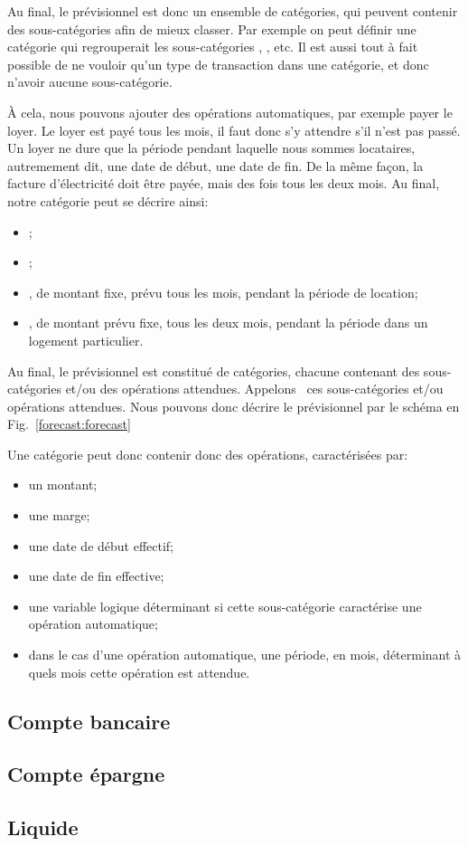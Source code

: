 Au final, le prévisionnel est donc un ensemble de catégories, qui
peuvent contenir des sous-catégories afin de mieux classer. Par
exemple on peut définir une catégorie 
qui regrouperait les sous-catégories ,
, etc. Il est aussi tout à fait possible
de ne vouloir qu'un type de transaction dans une catégorie, et
donc n'avoir aucune sous-catégorie.

\`A cela, nous pouvons ajouter des opérations automatiques, par
exemple payer le loyer. Le loyer est payé tous les mois, il faut
donc s'y attendre s'il n'est pas passé. Un loyer ne dure que la période
pendant laquelle nous sommes locataires, autremement dit, une date de
début, une date de fin. De la même façon, la facture d'électricité doit
être payée, mais des fois tous les deux mois. Au final, notre catégorie
 peut se décrire ainsi:
\begin{itemize}
\item {};
\item {};
\item {}, de montant fixe, prévu tous les mois, pendant la période
                           de location;
\item {}, de montant prévu fixe, tous les deux mois,
                                    pendant la période dans un logement particulier.
\end{itemize}

Au final, le prévisionnel est constitué de catégories, chacune contenant des sous-catégories
et/ou des opérations attendues. Appelons \operation\ ces sous-catégories et/ou
opérations attendues. Nous pouvons donc décrire le prévisionnel par le schéma
en Fig.~\ref{forecast:forecast}

Une catégorie peut donc contenir donc des opérations, caractérisées
par:
\begin{itemize}
\item un montant;
\item une marge;
\item une date de début effectif;
\item une date de fin effective;
\item une variable logique déterminant si cette sous-catégorie
        caractérise une opération automatique;
\item dans le cas d'une opération automatique, une période, en mois,
        déterminant à quels mois cette opération est attendue.
\end{itemize}

\subsection{Compte bancaire}
\subsection{Compte épargne}
\subsection{Liquide}

